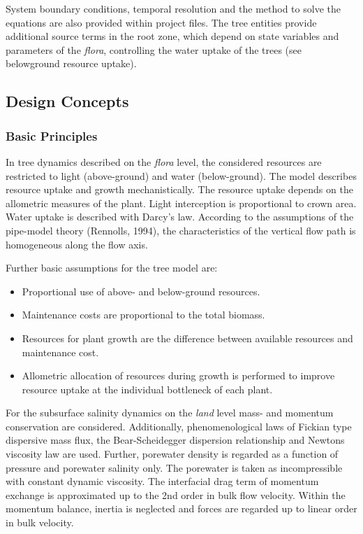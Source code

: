 System boundary conditions, temporal resolution and the method to solve the equations are also provided within project files.
The tree entities provide additional source terms in the root zone, which depend on state variables and parameters of the \textit{flora}, controlling the water uptake of the trees (see belowground resource uptake).
\subsection{Design Concepts}
\subsubsection{Basic Principles}
In tree dynamics described on the \textit{flora} level, the considered resources are restricted to light (above-ground) and water (below-ground).
The model describes resource uptake and growth mechanistically.
The resource uptake depends on the allometric measures of the plant.
Light interception is proportional to crown area.
Water uptake is described with Darcy’s law.
According to the assumptions of the pipe-model theory (Rennolls, 1994), the characteristics of the vertical flow path is homogeneous along the flow axis.

Further basic assumptions for the tree model are:
\begin{itemize}
\item Proportional use of above- and below-ground resources.
\item Maintenance costs are proportional to the total biomass.
\item Resources for plant growth are the difference between available resources and maintenance cost.
\item Allometric allocation of resources during growth is performed to improve resource uptake at the individual bottleneck of each plant.
\end{itemize}
For the subsurface salinity dynamics on the \textit{land} level mass- and momentum conservation are considered.
Additionally, phenomenological laws of Fickian type dispersive mass flux, the Bear-Scheidegger dispersion relationship and Newtons viscosity law are used.
Further, porewater density is regarded as a function of pressure and porewater salinity only.
The porewater is taken as incompressible with constant dynamic viscosity.
The interfacial drag term of momentum exchange is approximated up to the 2nd order in bulk flow velocity.
Within the momentum balance, inertia is neglected and forces are regarded up to linear order in bulk velocity.
